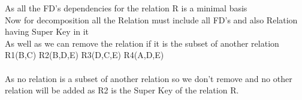 
As all the FD's dependencies for the relation R is a minimal basis \\

Now for decomposition all the Relation must include all FD's and also Relation having Super Key in it\\

As well as we can remove the relation if it is the subset of another relation \\ 

R1(B,C)   R2(B,D,E)  R3(D,C,E)  R4(A,D,E) \\ \\

As no relation is a subset of another relation so we don't remove and no other relation will be added as R2 is the Super Key of the relation R.



